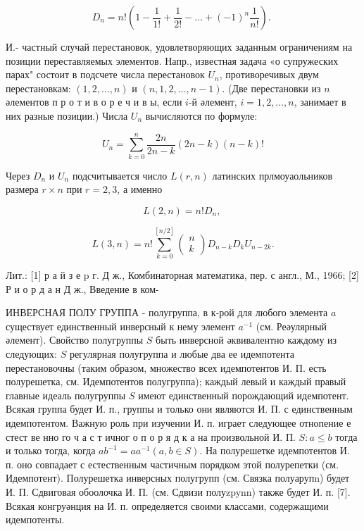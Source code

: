 \documentclass[10pt]{article}
\begin{document}
\[

D_{n}=n !\left(1-\frac{1}{1 !}+\frac{1}{2 !}-\ldots+(-1)^{n} \frac{1}{n !}\right) \text {. }

\]



И.- частный случай перестановок, удовлетворяющих заданным ограничениям на позиции переставляемых элементов. Напр., известная задача «о супружеских парах" состоит в подсчете числа перестановок $U_{n}$, противоречивых двум перестановкам: $(1,2, \ldots, n)$ и $(n, 1,2, \ldots, n-1)$. (Две перестановки из $n$ әлементов п р о т и в о р е ч и в ы, если $i$-й әлемент, $i=1,2, \ldots, n$, занимает в них разные позиции.) Числа $U_{n}$ вычисляются по формуле:



\[

U_{n}=\sum_{k=0}^{n} \frac{2 n}{2 n-k}(2 n-k)(n-k) !

\]



Через $D_{n}$ и $U_{n}$ подсчитывается число $L(r, n)$ латинских прлмоуаольников размера $r \times n$ при $r=2,3$, а именно



\[

L(2, n)=n ! D_{n} \text {, }

\]



\[

L(3, n)=n ! \sum_{k=0}^{[n / 2]}\left(\begin{array}{l}

n \\

k

\end{array}\right) D_{n-k} D_{k} U_{n-2 k} .

\]



Лит.: [1] р а й з е p г. Д ж., Комбинаторная математика, пер. с англ., М., 1966; [2] Р и о р д а н Д ж., Введение в ком-



ИНВЕРСНАЯ ПОЛУ ГРУППА - полугруппа, в к-рой для любого элемента $a$ существует единственный инверсный к нему элемент $a^{-1}$ (см. Реәулярный әлемент). Свойство полугруппы $S$ быть инверсной әквивалентно каждому из следующих: $S$ регулярная полугруппа и любые два ее идемпотента перестановочны (таким образом, множество всех идемпотентов И. П. есть полурешетка, см. Идемпотентов полугруппа); каждый левый и каждый правый главные идеаль полугруппы $S$ имеют единственный порождающий идемпотент. Всякая группа будет И. п., группы и только они являются И. П. с единственным идемпотентом. Важную роль при изучении И. п. играет следующее отнопение е стест ве нно го ч а с т ичног о п о р я д к а на произвольной И. П. $S: a \leqslant b$ тогда и только тогда, когда $a b^{-1}=a a^{-1}(a, b \in S)$. На полурешетке идемпотентов И. п. оно совпадает с естественным частичным порядком этой полурепетки (см. Идемпотент). Полурешетка инверсных полугрупп (см. Связка полуарупn) будет И. П. Сдвиговая обоолочка И. П. (см. Сдвизи полуzpynn) также будет И. п. [7]. Всякая конгруәнция на И. п. определяется своими классами, содержащими идемпотенты.
\end{document}
